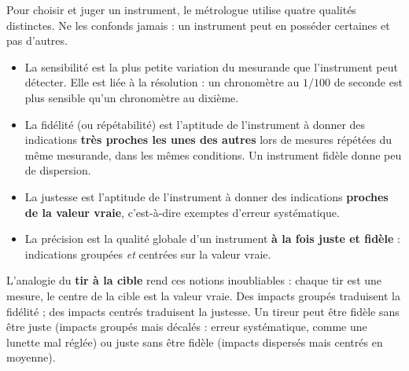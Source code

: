 \documentclass[11pt]{article}
\newcommand{\cle}[1]{{\popxbold\color{popdark}#1}}
\begin{document}
Pour choisir et juger un instrument, le métrologue utilise quatre qualités distinctes. Ne les confonds jamais : un instrument peut en posséder certaines et pas d'autres.

\begin{definition}
\begin{itemize}
\item La \cle{sensibilité} est la plus petite variation du mesurande que l'instrument peut détecter. Elle est liée à la résolution : un chronomètre au $1/100$ de seconde est plus sensible qu'un chronomètre au dixième.
\item La \cle{fidélité} (ou répétabilité) est l'aptitude de l'instrument à donner des indications \textbf{très proches les unes des autres} lors de mesures répétées du même mesurande, dans les mêmes conditions. Un instrument fidèle donne peu de dispersion.
\item La \cle{justesse} est l'aptitude de l'instrument à donner des indications \textbf{proches de la valeur vraie}, c'est-à-dire exemptes d'erreur systématique.
\item La \cle{précision} est la qualité globale d'un instrument \textbf{à la fois juste et fidèle} : indications groupées \emph{et} centrées sur la valeur vraie.
\end{itemize}
\end{definition}

L'analogie du \textbf{tir à la cible} rend ces notions inoubliables : chaque tir est une mesure, le centre de la cible est la valeur vraie. Des impacts groupés traduisent la fidélité ; des impacts centrés traduisent la justesse. Un tireur peut être fidèle sans être juste (impacts groupés mais décalés : erreur systématique, comme une lunette mal réglée) ou juste sans être fidèle (impacts dispersés mais centrés en moyenne).
\end{document}
